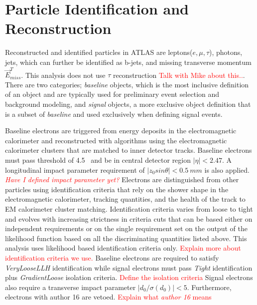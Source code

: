 \section{Particle Identification and Reconstruction}
\label{sec:obj:reco}

Reconstructed and identified particles in ATLAS are leptons($e, \mu, \tau$), photons, jets, which can further be identified as b-jets, and missing transverse momentum $\vec{E}^T_{miss}$.  This analysis does not use $\tau$ reconstruction \textcolor{red}{Talk with Mike about this..}. There are two categories; \textit{baseline} objects, which is the most inclusive definition of an object and are typically used for preliminary event selection and background modeling, and \textit{signal} objects, a more exclusive object definition that is a subset of \textit{baseline} and used exclusively when defining signal events. 

Baseline electrons are triggered from energy deposits in the electromagnetic calorimeter and reconstructed with algorithms using the electromagnetic calorimeter clusters that are matched to inner detector tracks.  Baseline electrons must pass \pt{} threshold of 4.5 ~\GeV and be in central detector region $|\eta | < 2.47$.  A longitudinal impact parameter requirement of $|z_0sin\theta| < 0.5~mm$ is also applied. \textcolor{red}{\textit{Have I defined impact parameter yet?}} Electrons are distinguished from other particles using identification criteria that rely on the shower shape in the electromagnetic calorimeter, tracking quantities, and the health of the track to EM calorimeter cluster matching.  Identification criteria varies from loose to tight and evolves with increasing strictness in criteria cuts that can be based either on independent requirements or on the single requirement set on the output of the likelihood function based on all the discriminating quantities listed above.  This analysis uses likelihood based identification criteria only.  \textcolor{red}{Explain more about identification criteria we use.}  Baseline electrons are required to satisfy \textit{VeryLooseLLH} identification while signal electrons must pass \textit{Tight} identification plus \textit{GradientLoose} isolation criteria. \textcolor{red}{Define the isolation criteria}  Signal electrons also require a transverse impact parameter $|d_0/\sigma(d_0)| < 5$. Furthermore, electrons with author 16 are vetoed.  \textcolor{red}{Explain what \textit{author 16} means}

